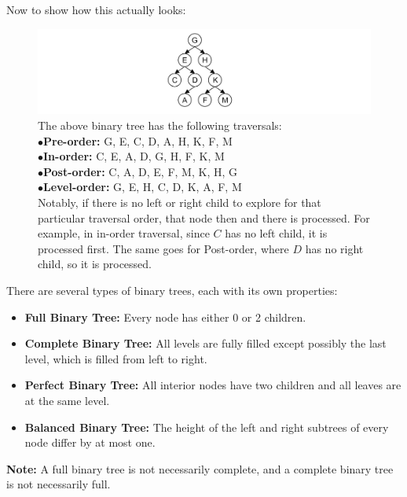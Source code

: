 \noindent
Now to show how this actually looks:
\begin{figure}[h]


    \hspace {-10em} \includegraphics[width=1.5\textwidth]{./Sections/graphs/binary_tree_traversals.png}
  
     \caption{%
        The above binary tree has the following traversals:\\[1em]
           $\bullet$\quad  \textbf{Pre-order:}  \hspace{.5em} G, E, C, D, A, H, K, F, M\\
           $\bullet$\quad  \textbf{In-order:}   \hspace{1.2em} C, E, A, D, G, H, F, K, M\\
           $\bullet$\quad  \textbf{Post-order:} \hspace{.05em} C, A, D, E, F, M, K, H, G\\
           $\bullet$\quad \textbf{Level-order:} G, E, H, C, D, K, A, F, M\\[1em]
         Notably, if there is no left or right child to explore for that particular traversal order, that node then and there is processed.
     For example, in in-order traversal, since $C$ has no left child, it is processed first. The same goes for Post-order, where $D$ has no right child, so it is processed.
     }\label{fig:binary_tree_traversals}
  \end{figure}

\begin{Def}

    There are several types of binary trees, each with its own properties:
    \begin{itemize}
        \item \textbf{Full Binary Tree:} Every node has either 0 or 2 children.
        \item \textbf{Complete Binary Tree:} All levels are fully filled except possibly the last level, which is filled from left to right.
        \item \textbf{Perfect Binary Tree:} All interior nodes have two children and all leaves are at the same level.
        \item \textbf{Balanced Binary Tree:} The height of the left and right subtrees of every node differ by at most one.
    \end{itemize}
    \noindent
    \textbf{Note:} A full binary tree is not necessarily complete, and a complete binary tree is not necessarily full.
\end{Def}

